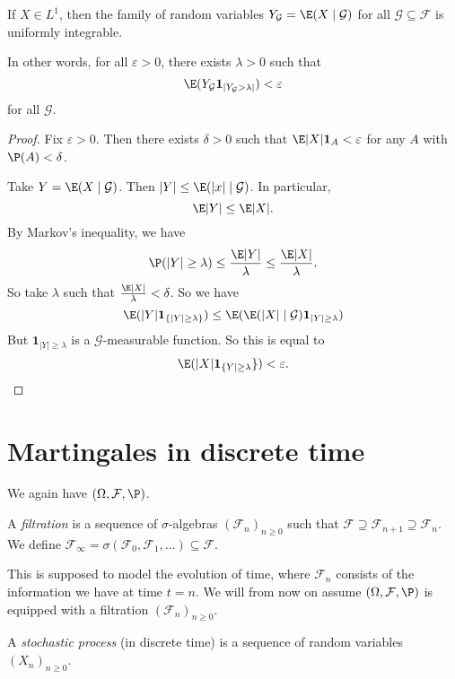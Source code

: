\documentclass[a4paper]{article}
\begin{document}
\begin{lemma}
  If $X \in L^1$, then the family of random variables $Y_{\mathcal{G}} = \E(X \mid \mathcal{G})$ for all $\mathcal{G} \subseteq \mathcal{F}$ is uniformly integrable.

  In other words, for all $\varepsilon > 0$, there exists $\lambda > 0$ such that
  \[
    \E(Y_{\mathcal{G}} \mathbf{1}_{|Y_{\mathcal{G}} > \lambda|}) < \varepsilon
  \]
  for all $\mathcal{G}$.
\end{lemma}

\begin{proof}
  Fix $\varepsilon > 0$. Then there exists $\delta > 0$ such that $\E |X|\mathbf{1}_A < \varepsilon$ for any $A$ with $\P(A) < \delta$.

  Take $Y = \E (X \mid \mathcal{G})$. Then $|Y| \leq \E(|x| \mid \mathcal{G})$. In particular,
  \[
    \E|Y| \leq \E|X|.
  \]
  By Markov's inequality, we have
  \[
    \P(|Y| \geq \lambda) \leq \frac{\E|Y|}{\lambda} \leq \frac{\E|X|}{\lambda}.
  \]
  So take $\lambda$ such that $\frac{\E|X|}{\lambda} < \delta$. So we have
  \[
    \E(|Y| \mathbf{1}_{\{|Y| \geq \lambda\}}) \leq \E(\E(|X| \mid \mathcal{G})\mathbf{1}_{|Y| \geq \lambda})
  \]
  But $\mathbf{1}_{|Y| \geq \lambda}$ is a $\mathcal{G}$-measurable function. So this is equal to
  \[
    \E(|X| \mathbf{1}_{\{Y| \geq \lambda}\}) < \varepsilon.
  \]
\end{proof}

\section{Martingales in discrete time}

We again have $(\Omega, \mathcal{F}, \P)$.

\begin{defi}[Filtration]
  A \emph{filtration} is a sequence of $\sigma$-algebras $(\mathcal{F}_n)_{n \geq 0}$ such that $\mathcal{F} \supseteq \mathcal{F}_{n + 1} \supseteq \mathcal{F}_n$. We define $\mathcal{F}_\infty = \sigma(\mathcal{F}_0, \mathcal{F}_1, \ldots) \subseteq \mathcal{F}$.
\end{defi}

This is supposed to model the evolution of time, where $\mathcal{F}_n$ consists of the information we have at time $t = n$. We will from now on assume $(\Omega, \mathcal{F}, \P)$ is equipped with a filtration $(\mathcal{F}_n)_{n \geq 0}$.

\begin{defi}
  A \emph{stochastic process} (in discrete time) is a sequence of random variables $(X_n)_{n \geq 0}$.
\end{defi}
\end{document}
